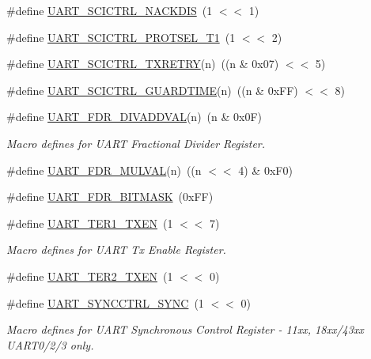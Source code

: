 \begin{DoxyCompactItemize}
\#define \hyperlink{group__UART__17XX__40XX_ga49ad93a6f4c7175b6111716e329bfb36}{U\-A\-R\-T\-\_\-\-S\-C\-I\-C\-T\-R\-L\-\_\-\-N\-A\-C\-K\-D\-I\-S}~(1 $<$$<$ 1)
\item 
\#define \hyperlink{group__UART__17XX__40XX_ga48e869912cabe85bef5d11cda3b773f4}{U\-A\-R\-T\-\_\-\-S\-C\-I\-C\-T\-R\-L\-\_\-\-P\-R\-O\-T\-S\-E\-L\-\_\-\-T1}~(1 $<$$<$ 2)
\item 
\#define \hyperlink{group__UART__17XX__40XX_gadd17c8f0f6239c42d18e4af35ee3effc}{U\-A\-R\-T\-\_\-\-S\-C\-I\-C\-T\-R\-L\-\_\-\-T\-X\-R\-E\-T\-R\-Y}(n)~((n \& 0x07) $<$$<$ 5)
\item 
\#define \hyperlink{group__UART__17XX__40XX_gac74665d22f8c0c1b18f46a65bbe5031a}{U\-A\-R\-T\-\_\-\-S\-C\-I\-C\-T\-R\-L\-\_\-\-G\-U\-A\-R\-D\-T\-I\-M\-E}(n)~((n \& 0x\-F\-F) $<$$<$ 8)
\item 
\#define \hyperlink{group__UART__17XX__40XX_ga08ae53568f606c894a5ffd764cef6171}{U\-A\-R\-T\-\_\-\-F\-D\-R\-\_\-\-D\-I\-V\-A\-D\-D\-V\-A\-L}(n)~(n \& 0x0\-F)
\begin{DoxyCompactList}\small\item\em Macro defines for U\-A\-R\-T Fractional Divider Register. \end{DoxyCompactList}\item 
\#define \hyperlink{group__UART__17XX__40XX_ga728a262cba31ffd0d7b4fb172f6dead7}{U\-A\-R\-T\-\_\-\-F\-D\-R\-\_\-\-M\-U\-L\-V\-A\-L}(n)~((n $<$$<$ 4) \& 0x\-F0)
\item 
\#define \hyperlink{group__UART__17XX__40XX_ga61a8f74c3fc22574793c6218b90fec50}{U\-A\-R\-T\-\_\-\-F\-D\-R\-\_\-\-B\-I\-T\-M\-A\-S\-K}~(0x\-F\-F)
\item 
\#define \hyperlink{group__UART__17XX__40XX_ga78f0ee43aa0e7c030a3cfa1dca5ff072}{U\-A\-R\-T\-\_\-\-T\-E\-R1\-\_\-\-T\-X\-E\-N}~(1 $<$$<$ 7)
\begin{DoxyCompactList}\small\item\em Macro defines for U\-A\-R\-T Tx Enable Register. \end{DoxyCompactList}\item 
\#define \hyperlink{group__UART__17XX__40XX_gac9ec0de9b40d5d9dd9fed4836a31122f}{U\-A\-R\-T\-\_\-\-T\-E\-R2\-\_\-\-T\-X\-E\-N}~(1 $<$$<$ 0)
\item 
\#define \hyperlink{group__UART__17XX__40XX_ga03c124f3fc8b888e5ee5a3fc7660bb7d}{U\-A\-R\-T\-\_\-\-S\-Y\-N\-C\-C\-T\-R\-L\-\_\-\-S\-Y\-N\-C}~(1 $<$$<$ 0)
\begin{DoxyCompactList}\small\item\em Macro defines for U\-A\-R\-T Synchronous Control Register -\/ 11xx, 18xx/43xx U\-A\-R\-T0/2/3 only. \end{DoxyCompactList}\item 

\end{DoxyCompactItemize}
